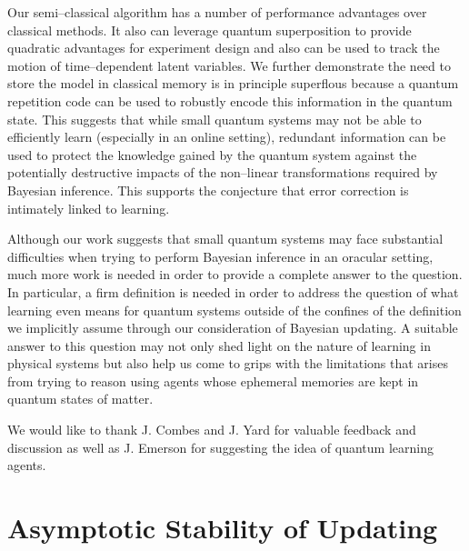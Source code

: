 \documentclass[aps,amsmath,onecolumn,amssymb,notitlepage]{revtex4-1}
\begin{document}
Our semi--classical algorithm has a number of performance advantages over classical methods.  It also can leverage quantum superposition to provide quadratic advantages for experiment design and also can be used to track the motion of time--dependent latent variables.  We further demonstrate the need to store the model in classical memory is in principle superflous because a quantum repetition code can be used to robustly encode this information in the quantum state.  This suggests that while small quantum systems may not be able to efficiently learn (especially in an online setting), redundant information can be used to protect the knowledge gained by the quantum system against the potentially destructive impacts of the non--linear transformations required by Bayesian inference.  This supports the conjecture that error correction is intimately linked to  learning.  

Although our work suggests that small quantum systems may face substantial difficulties when trying to perform Bayesian inference in an oracular setting, much more work is needed in order to provide a complete answer to the question.  In particular, a firm definition is needed in order to address the question of what learning even means for quantum systems outside of the confines of the definition we implicitly assume through our consideration of Bayesian updating.  A suitable answer to this question may not only shed light on the nature of learning in physical systems but also help us come to grips with the limitations that arises from trying to reason using agents whose ephemeral memories are kept in quantum states of matter.

\begin{acknowledgments}
We would like to thank J. Combes and J. Yard for valuable feedback and discussion as well as J. Emerson for suggesting the idea of quantum learning agents.
\end{acknowledgments}




\appendix
\section{Asymptotic Stability of Updating}\label{app:stability}
\end{document}
